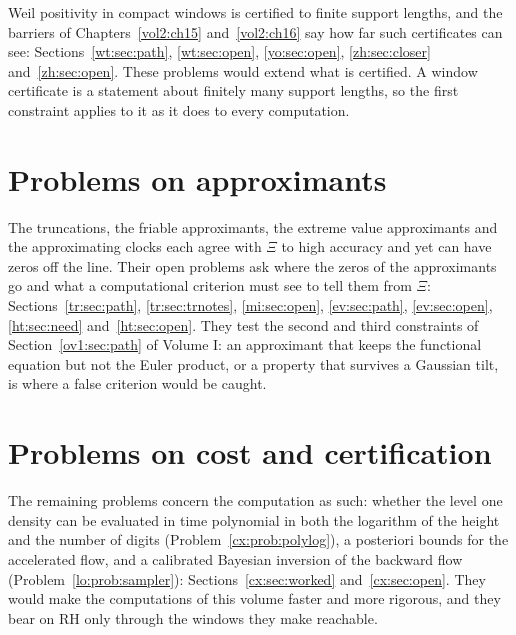 Weil positivity in compact windows is certified to finite support lengths, and the barriers of Chapters~\ref{vol2:ch15} and~\ref{vol2:ch16} say how far such certificates can see: Sections~\ref{wt:sec:path}, \ref{wt:sec:open}, \ref{yo:sec:open}, \ref{zh:sec:closer} and~\ref{zh:sec:open}. These problems would extend what is certified. A window certificate is a statement about finitely many support lengths, so the first constraint applies to it as it does to every computation.

\section{Problems on approximants}\label{ov2:sec:approx}

The truncations, the friable approximants, the extreme value approximants and the approximating clocks each agree with $\Xi$ to high accuracy and yet can have zeros off the line. Their open problems ask where the zeros of the approximants go and what a computational criterion must see to tell them from $\Xi$: Sections~\ref{tr:sec:path}, \ref{tr:sec:trnotes}, \ref{mi:sec:open}, \ref{ev:sec:path}, \ref{ev:sec:open}, \ref{ht:sec:need} and~\ref{ht:sec:open}. They test the second and third constraints of Section~\ref{ov1:sec:path} of Volume I: an approximant that keeps the functional equation but not the Euler product, or a property that survives a Gaussian tilt, is where a false criterion would be caught.

\section{Problems on cost and certification}\label{ov2:sec:cost}

The remaining problems concern the computation as such: whether the level one density can be evaluated in time polynomial in both the logarithm of the height and the number of digits (Problem~\ref{cx:prob:polylog}), a posteriori bounds for the accelerated flow, and a calibrated Bayesian inversion of the backward flow (Problem~\ref{lo:prob:sampler}): Sections~\ref{cx:sec:worked} and~\ref{cx:sec:open}. They would make the computations of this volume faster and more rigorous, and they bear on RH only through the windows they make reachable.
